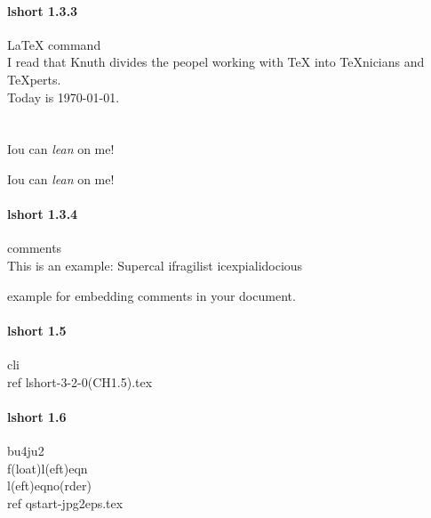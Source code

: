 \documentclass[a4paper,11pt]{book} %
\begin{document}
\paragraph{lshort 1.3.3} \LaTeX{} command
\\  %
I read that Knuth divides the peopel working with \TeX{} into \TeX{}nicians and
\TeX perts.
\\
Today is \today.
\\  %
\\  %
\\  %
Iou can \textsl{lean} on me!

Iou can \textsl{lean} on me!

\paragraph{lshort 1.3.4}comments
\\This is an %
example: Supercal%
                ifragilist%
        icexpialidocious
\begin{comment}
This is another
rather stupid,
but helpful
\end{comment}
example for embedding
comments in your document.

\paragraph{lshort 1.5}cli
\\ref lshort-3-2-0(CH1.5).tex
\begin{comment} %
12711  xdvi lshort-3_2_0\(CH1.5\).dvi
12712  dvips -Pcmz lshort-3_2_0\(CH1.5\).dvi -o foo.ps
12713  echo $?
\end{comment}

\paragraph{lshort 1.6}bu4ju2 %
\\f(loat)l(eft)eqn
\\l(eft)eqno(rder)
\\ref qstart-jpg2eps.tex
\end{document}
